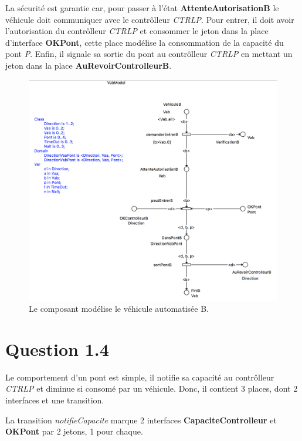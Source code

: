 \documentclass[a4paper,11pt]{report}
\begin{document}
	La sécurité est garantie car, pour passer à l'état \textbf{AttenteAutorisationB} le véhicule doit communiquer avec le contrôlleur \textit{CTRLP}. Pour entrer, il doit avoir l'autorisation du contrôlleur \textit{CTRLP} et consommer le jeton dans la place d'interface \textbf{OKPont},  cette place modélise la consommation de la capacité du pont \textit{P}. Enfin, il signale sa sortie du pont au contrôlleur \textit{CTRLP} en mettant un jeton dans la place \textbf{AuRevoirControlleurB}.

		\begin{figure}[!htbp]
		\centering
		\includegraphics[width = 15cm]{vabModel.png}
		\caption{Le composant modélise le véhicule automatisée B.}
	\end{figure}
	\newpage
	
	
\section{Question 1.4}
	Le comportement d'un pont est simple, il notifie  sa capacité au contrôlleur \textit{CTRLP} et diminue si consomé par un véhicule. Donc, il contient 3 places, dont 2 interfaces et une transition.
	
	La transition \textit{notifieCapacite} marque 2 interfaces \textbf{CapaciteControlleur} et \textbf{OKPont} par 2 jetons, 1 pour chaque.
\end{document}
